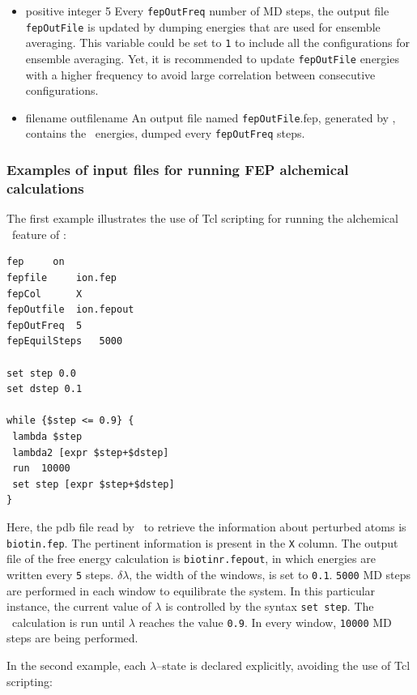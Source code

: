 \begin{itemize}
\item
{}
{positive integer}
{5}
{Every {\tt fepOutFreq} number of MD steps, the output file
{\tt fepOutFile} is updated by dumping energies that are
used for ensemble averaging.
This variable could be set to {\tt 1} to include all the 
configurations for ensemble averaging. Yet, it is recommended
to update {\tt fepOutFile}  energies with a
higher frequency 
to avoid large correlation between consecutive configurations.}

\item
{}
{filename}
{outfilename}
{An output file named {\tt fepOutFile}.fep, generated by \NAMD,
contains the \FEP\ energies, dumped every {\tt fepOutFreq} steps.}

\end{itemize}


\subsubsection{Examples of input files for running FEP alchemical calculations}


The first example illustrates the use of Tcl scripting for running
the alchemical \FEP\ feature of \NAMD: 

\begin{verbatim}
fep		on  
fepfile		ion.fep
fepCol		X
fepOutfile	ion.fepout
fepOutFreq	5
fepEquilSteps	5000

set step 0.0
set dstep 0.1

while {$step <= 0.9} {
 lambda $step
 lambda2 [expr $step+$dstep]
 run  10000
 set step [expr $step+$dstep]
}
\end{verbatim}

Here, the pdb file read by \NAMD\ to retrieve the information
about perturbed atoms is {\tt biotin.fep}. The pertinent information 
is present in the {\tt X} column. The output file of the free energy
calculation is {\tt biotinr.fepout}, in which energies are written
every {\tt 5} steps.
$\delta \lambda$, the width of the windows, is set to {\tt 0.1}.
{\tt 5000} MD steps are performed in each window to
equilibrate the system. In this particular instance, 
the current value of $\lambda$
is controlled by the syntax {\tt set step}. 
The \FEP\ calculation is run until $\lambda$ reaches the
value {\tt 0.9}. In every window, {\tt 10000} MD steps
are being performed.


In the second example, each $\lambda$--state is declared
explicitly, avoiding the use of Tcl scripting:

